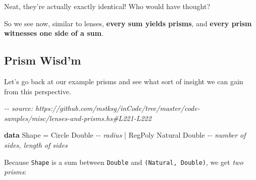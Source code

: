 \documentclass[]{article}
\newenvironment{Shaded}{}{}
\newcommand{\CommentTok}[1]{\textcolor[rgb]{0.38,0.63,0.69}{\textit{#1}}}
\newcommand{\DataTypeTok}[1]{\textcolor[rgb]{0.56,0.13,0.00}{#1}}
\newcommand{\KeywordTok}[1]{\textcolor[rgb]{0.00,0.44,0.13}{\textbf{#1}}}
\newcommand{\OperatorTok}[1]{\textcolor[rgb]{0.40,0.40,0.40}{#1}}
\newcommand{\OtherTok}[1]{\textcolor[rgb]{0.00,0.44,0.13}{#1}}
\begin{document}
Neat, they're actually exactly identical! Who would have thought?

So we see now, similar to lenses, \textbf{every sum yields prisms}, and
\textbf{every prism witnesses one side of a sum}.

\hypertarget{prism-wisdm}{%
\subsection{Prism Wisd'm}\label{prism-wisdm}}

Let's go back at our example prisms and see what sort of insight we can gain
from this perspective.

\begin{Shaded}
\begin{Highlighting}[]
\CommentTok{{-}{-} source: https://github.com/mstksg/inCode/tree/master/code{-}samples/misc/lenses{-}and{-}prisms.hs\#L221{-}L222}

\KeywordTok{data} \DataTypeTok{Shape} \OtherTok{=} \DataTypeTok{Circle}  \DataTypeTok{Double}           \CommentTok{{-}{-} radius}
           \OperatorTok{|} \DataTypeTok{RegPoly} \DataTypeTok{Natural} \DataTypeTok{Double}   \CommentTok{{-}{-} number of sides, length of sides}
\end{Highlighting}
\end{Shaded}

Because \texttt{Shape} is a sum between \texttt{Double} and
\texttt{(Natural,\ Double)}, we get \emph{two prisms}:
\end{document}
